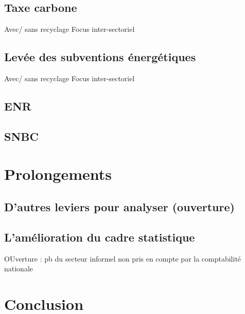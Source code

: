 \documentclass[
]{article}
\begin{document}
\hypertarget{taxe-carbone-1}{%
\subsection{Taxe carbone}\label{taxe-carbone-1}}

Avec/ sans recyclage Focus inter-sectoriel

\hypertarget{levuxe9e-des-subventions-uxe9nerguxe9tiques}{%
\subsection{Levée des subventions
énergétiques}\label{levuxe9e-des-subventions-uxe9nerguxe9tiques}}

Avec/ sans recyclage Focus inter-sectoriel

\hypertarget{enr}{%
\subsection{ENR}\label{enr}}

\hypertarget{snbc}{%
\subsection{SNBC}\label{snbc}}

\hypertarget{prolongements}{%
\section{Prolongements}\label{prolongements}}

\hypertarget{dautres-leviers-pour-analyser-ouverture}{%
\subsection{D'autres leviers pour analyser
(ouverture)}\label{dautres-leviers-pour-analyser-ouverture}}

\hypertarget{lamuxe9lioration-du-cadre-statistique}{%
\subsection{L'amélioration du cadre
statistique}\label{lamuxe9lioration-du-cadre-statistique}}

OUverture : pb du secteur informel non pris en compte par la
comptabilité nationale

\hypertarget{conclusion}{%
\section{Conclusion}\label{conclusion}}

\printbibliography[title=Bibliographie]
\end{document}
